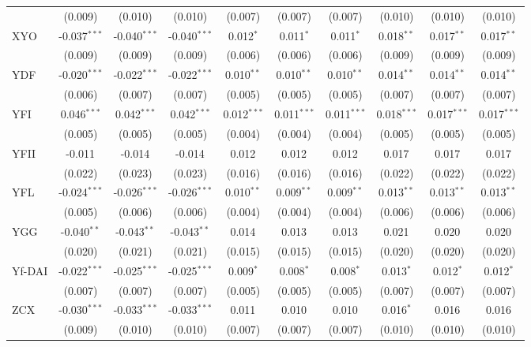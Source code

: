 \begin{table}[!htbp]
\begin{tabular}{@{\extracolsep{5pt}}lccccccccc}
  & (0.009) & (0.010) & (0.010) & (0.007) & (0.007) & (0.007) & (0.010) & (0.010) & (0.010) \\
 XYO & -0.037$^{***}$ & -0.040$^{***}$ & -0.040$^{***}$ & 0.012$^{*}$ & 0.011$^{*}$ & 0.011$^{*}$ & 0.018$^{**}$ & 0.017$^{**}$ & 0.017$^{**}$ \\
  & (0.009) & (0.009) & (0.009) & (0.006) & (0.006) & (0.006) & (0.009) & (0.009) & (0.009) \\
 YDF & -0.020$^{***}$ & -0.022$^{***}$ & -0.022$^{***}$ & 0.010$^{**}$ & 0.010$^{**}$ & 0.010$^{**}$ & 0.014$^{**}$ & 0.014$^{**}$ & 0.014$^{**}$ \\
  & (0.006) & (0.007) & (0.007) & (0.005) & (0.005) & (0.005) & (0.007) & (0.007) & (0.007) \\
 YFI & 0.046$^{***}$ & 0.042$^{***}$ & 0.042$^{***}$ & 0.012$^{***}$ & 0.011$^{***}$ & 0.011$^{***}$ & 0.018$^{***}$ & 0.017$^{***}$ & 0.017$^{***}$ \\
  & (0.005) & (0.005) & (0.005) & (0.004) & (0.004) & (0.004) & (0.005) & (0.005) & (0.005) \\
 YFII & -0.011$^{}$ & -0.014$^{}$ & -0.014$^{}$ & 0.012$^{}$ & 0.012$^{}$ & 0.012$^{}$ & 0.017$^{}$ & 0.017$^{}$ & 0.017$^{}$ \\
  & (0.022) & (0.023) & (0.023) & (0.016) & (0.016) & (0.016) & (0.022) & (0.022) & (0.022) \\
 YFL & -0.024$^{***}$ & -0.026$^{***}$ & -0.026$^{***}$ & 0.010$^{**}$ & 0.009$^{**}$ & 0.009$^{**}$ & 0.013$^{**}$ & 0.013$^{**}$ & 0.013$^{**}$ \\
  & (0.005) & (0.006) & (0.006) & (0.004) & (0.004) & (0.004) & (0.006) & (0.006) & (0.006) \\
 YGG & -0.040$^{**}$ & -0.043$^{**}$ & -0.043$^{**}$ & 0.014$^{}$ & 0.013$^{}$ & 0.013$^{}$ & 0.021$^{}$ & 0.020$^{}$ & 0.020$^{}$ \\
  & (0.020) & (0.021) & (0.021) & (0.015) & (0.015) & (0.015) & (0.020) & (0.020) & (0.020) \\
 Yf-DAI & -0.022$^{***}$ & -0.025$^{***}$ & -0.025$^{***}$ & 0.009$^{*}$ & 0.008$^{*}$ & 0.008$^{*}$ & 0.013$^{*}$ & 0.012$^{*}$ & 0.012$^{*}$ \\
  & (0.007) & (0.007) & (0.007) & (0.005) & (0.005) & (0.005) & (0.007) & (0.007) & (0.007) \\
 ZCX & -0.030$^{***}$ & -0.033$^{***}$ & -0.033$^{***}$ & 0.011$^{}$ & 0.010$^{}$ & 0.010$^{}$ & 0.016$^{*}$ & 0.016$^{}$ & 0.016$^{}$ \\
  & (0.009) & (0.010) & (0.010) & (0.007) & (0.007) & (0.007) & (0.010) & (0.010) & (0.010) \\

\end{tabular}
\end{table}
